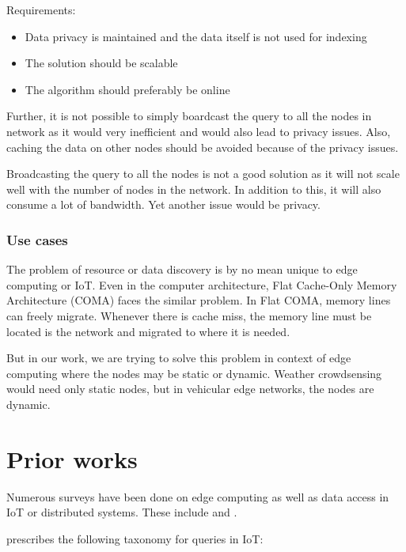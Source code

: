 Requirements:
\begin{itemize}
      \item Data privacy is maintained and the data itself is not used for
      indexing
      \item The solution should be scalable
      \item The algorithm should preferably be online
\end{itemize}

Further, it is not possible to simply boardcast the query to all the nodes in
network as it would very inefficient and would also lead to privacy issues.
Also, caching the data on other nodes should be avoided because of the privacy
issues.

Broadcasting the query to all the nodes is not a good solution as it will not
scale well with the number of nodes in the network. In addition to this, it will
also consume a lot of bandwidth. Yet another issue would be privacy.

\subsubsection{Use cases}
The problem of resource or data discovery is by no mean unique to edge computing
or IoT. Even in the computer architecture, Flat Cache-Only Memory Architecture
(COMA) faces the similar problem. In Flat COMA, memory lines can freely migrate.
Whenever there is cache miss, the memory line must be located is the network and
migrated to where it is needed.
\cite{joseptorrellasCacheOnlyMemoryArchitecture}

But in our work, we are trying to solve this problem in context of edge
computing where the nodes may be static or dynamic. Weather crowdsensing would
need only static nodes, but in vehicular edge networks, the nodes are dynamic.


\section{Prior works}

Numerous surveys have been done on edge computing as well as data access in IoT
or distributed systems. These include \citet{kouahlaSurveyBigIoT2022} and
\citet{fathyLargeScaleIndexingDiscovery2018}.

\citet{fathyLargeScaleIndexingDiscovery2018} prescribes the following taxonomy
for queries in IoT:


